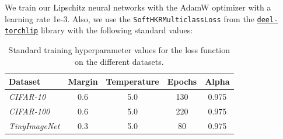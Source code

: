 We train our Lipschitz neural networks with the AdamW optimizer with a learning rate 1e-3. Also, we use the \texttt{SoftHKRMulticlassLoss} from the \href{https://github.com/deel-ai/deel-torchlip}{\texttt{deel-torchlip}} library with the following standard values:

\begin{table}[h]
  \centering
  \begin{tabular}{l
                  S[table-format=1.1]
                  S[table-format=1.1]
                  S[table-format=3.0]
                  S[table-format=1.3]}
    \toprule
    \textbf{Dataset}   & {\textbf{Margin}} & {\textbf{Temperature}} & {\textbf{Epochs}} & {\textbf{Alpha}} \\
    \midrule
    \textsl{CIFAR-10}           & 0.6               & 5.0                    & 130               & 0.975            \\
    \textsl{CIFAR-100}          & 0.6               & 5.0                    & 220               & 0.975            \\
    \textsl{TinyImageNet}       & 0.3               & 5.0                    &  80               & 0.975            \\
    \bottomrule
  \end{tabular}
  \caption{Standard training hyperparameter values for the loss function on the different datasets.}
  \label{tab:hyperparams}
\end{table}

